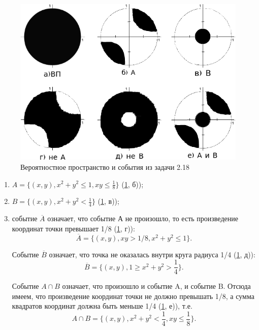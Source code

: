 \begin{figure}[h!]
  \centering
  \includegraphics[width=.7\textwidth]{./pictures/2_18.png}
  \caption{Вероятностное пространство и события из задачи 2.18}
  \label{fig:218}
\end{figure}

\begin{enumerate}[label=\alph*)]
\item $ A =
\{ (x, y), x^2 + y^2 \leq 1, xy \leq \frac{ 1 }{ 8 } \} $ (\ref{fig:218}, б));

\item $ B =
\{ (x, y), x^2 + y^2 < \frac{ 1 }{ 4 } \} $ (\ref{fig:218}, в));

\item событие $ \overline{ A } $ означает, что событие А не произошло, то есть произведение координат точки превышает 1/8 (\ref{fig:218}, г)):
$$ \overline{ A } =
\{ (x, y), xy > 1/8, x^2 + y^2 \leq 1 \}.$$

Событие $ \overline{ B } $ означает, что точка не оказалась внутри круга радиуса 1/4 (\ref{fig:218}, д)):
$$ \overline{ B } =
\{ (x, y), 1 \geq x^2 + y^2 > \frac{ 1 }{ 4 } \}.$$

Событие $ A \cap B $ означает, что произошло и событие A, и событие B.
Отсюда имеем, что произведение координат точки не должно превышать 1/8, а сумма квадратов координат должна быть меньше 1/4 (\ref{fig:218}, е)), т.е.
$$ A \cap B =
\{ (x, y), x^2 + y^2 < \frac{ 1 }{ 4 }, xy \leq \frac{ 1 }{ 8 } \}.$$
\end{enumerate}
